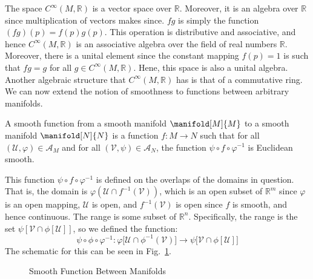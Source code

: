         The space $C^{\infty}(M,\mathbb{R})$ is a vector space over
        $\mathbb{R}$. Moreover, it is an algebra over $\mathbb{R}$ since
        multiplication of vectors makes since. $fg$ is simply the function
        $(fg)(p)=f(p)g(p)$. This operation is distributive and associative,
        and hence $C^{\infty}(M,\mathbb{R})$ is an associative algebra over
        the field of real numbers $\mathbb{R}$. Moreover, there is a unital
        element since the constant mapping $f(p)=1$ is such that
        $fg=g$ for all $g\in{C}^{\infty}(M,\mathbb{R})$. Hene, this space is
        also a unital algebra. Another algebraic structure that
        $C^{\infty}(M,\mathbb{R})$ has is that of a commutative ring. We can
        now extend the notion of smoothness to functions between arbitrary
        manifolds.
        \begin{definition}
            A smooth function from a smooth manifold $\manifold[M]{M}$ to a
            smooth manifold $\manifold[N]{N}$ is a function
            $f:M\rightarrow{N}$ such that for all
            $(\mathcal{U},\varphi)\in\mathcal{A}_{M}$ and for all
            $(\mathcal{V},\psi)\in\mathcal{A}_{N}$, the function
            $\psi\circ{f}\circ\varphi^{\minus{1}}$ is Euclidean smooth.
        \end{definition}
        This function $\psi\circ{f}\circ\varphi^{\minus{1}}$ is defined on
        the overlaps of the domains in question. That is, the domain is
        $\varphi(\mathcal{U}\cap{f}^{\minus{1}}(\mathcal{V}))$, which is an
        open subset of $\mathbb{R}^{m}$ since $\varphi$ is an open mapping,
        $\mathcal{U}$ is open, and $f^{\minus{1}}(\mathcal{V})$ is open
        since $f$ is smooth, and hence continuous. The range is some subset
        of $\mathbb{R}^{n}$. Specifically, the range is the set
        $\psi[\mathcal{V}\cap\phi[\mathcal{U}]]$, so we defined the
        function:
        \begin{equation}
            \psi\circ\phi\circ\varphi^{\minus{1}}:
                \varphi\big[\mathcal{U}\cap
                    \phi^{\minus{1}}(\mathcal{V})\big]\rightarrow
                \psi\big[\mathcal{V}\cap\phi[\mathcal{U}]\big]
        \end{equation}
        The schematic for this can be seen in
        Fig.~\ref{fig:Smooth_Function_Between_Manifolds}.
        \begin{figure}[H]
            \centering
            \captionsetup{type=figure}
            
            \caption{Smooth Function Between Manifolds}
            \label{fig:Smooth_Function_Between_Manifolds}
        \end{figure}

